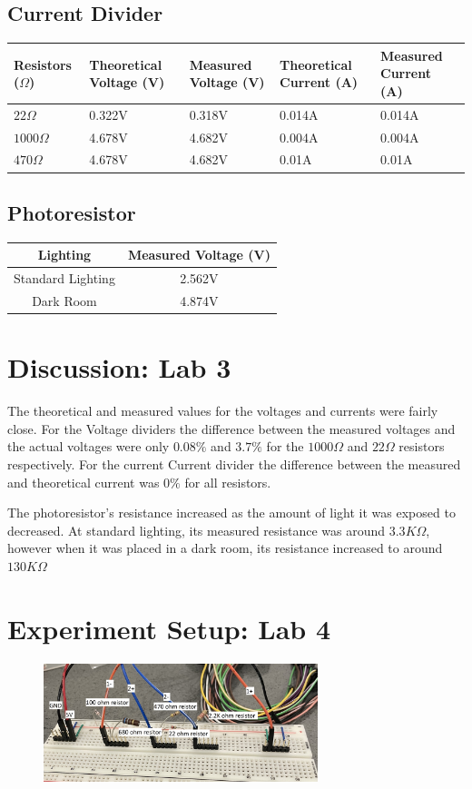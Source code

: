 \documentclass[12pt]{article}
\begin{document}
\subsection*{Current Divider}
\begin{center}
\begin{tabular}{||m{1.5cm}|m{2cm}|m{2cm}|m{2cm}|m{2cm}||}
\hline
Resistors ($\Omega$) & Theoretical Voltage (V) & Measured Voltage (V) & Theoretical Current (A) & Measured Current (A)\\
\hline
\hline
$22\Omega$ & 0.322V & 0.318V&0.014A &0.014A\\
\hline
$1000\Omega$ &4.678V &4.682V &0.004A &0.004A\\
\hline
$470\Omega$ &4.678V &4.682V &0.01A &0.01A\\
\hline
\end{tabular}
\end{center}
\subsection*{Photoresistor}
\begin{center}
\begin{tabular}{||c|c ||}
\hline
Lighting & Measured Voltage (V)\\
\hline
\hline
Standard Lighting & 2.562V\\
\hline
Dark Room  &4.874V\\
\hline
\end{tabular}
\end{center}
\section*{Discussion: Lab 3}
The theoretical and measured values for the voltages and currents were fairly close. For the Voltage dividers the difference between the measured voltages and the actual voltages were only $0.08\%$ and $3.7\%$ for the $1000\Omega$ and $22\Omega$ resistors respectively. For the current  Current divider the difference between the measured and theoretical current was $0\%$ for all resistors.

The photoresistor's resistance increased as the amount of light it was exposed to decreased. At standard lighting, its measured resistance was around $3.3K\Omega$, however when it was placed in a dark room, its resistance increased to around $130K\Omega$
\pagebreak
\section*{Experiment Setup: Lab 4}
\begin{figure}[h]
\includegraphics[width=8cm]{Lab4}
\centering
\end{figure}
\end{document}
